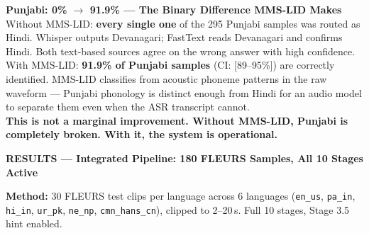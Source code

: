 \documentclass[11pt,a4paper]{article}
\begin{document}
\begin{tcolorbox}[enhanced,colback=LOrange,colframe=DOrange,arc=6pt,boxrule=2pt,
  left=9pt,right=9pt,top=7pt,bottom=7pt]
\textbf{\color{DOrange}\large Punjabi: 0\% $\to$ 91.9\% --- The Binary Difference MMS-LID Makes}\\[4pt]
Without MMS-LID: \textbf{every single one} of the 295 Punjabi samples was routed as Hindi. Whisper outputs Devanagari; FastText reads Devanagari and confirms Hindi. Both text-based sources agree on the wrong answer with high confidence.\\[4pt]
With MMS-LID: \textbf{91.9\% of Punjabi samples} (CI: [89--95\%]) are correctly identified. MMS-LID classifies from acoustic phoneme patterns in the raw waveform --- Punjabi phonology is distinct enough from Hindi for an audio model to separate them even when the ASR transcript cannot.\\[4pt]
\textbf{This is not a marginal improvement. Without MMS-LID, Punjabi is completely broken. With it, the system is operational.}
\end{tcolorbox}

\newpage

\begin{tcolorbox}[enhanced,colback=DOrange,colframe=DOrange,arc=5pt,boxrule=0pt,
  left=10pt,right=10pt,top=5pt,bottom=5pt]
{\large\bfseries\color{white}RESULTS --- Integrated Pipeline: 180 FLEURS Samples, All 10 Stages Active}
\end{tcolorbox}

\vspace{5pt}

\begin{tcolorbox}[enhanced,colback=LGray,colframe=MGray!50,arc=4pt,boxrule=0.7pt,
  left=7pt,right=7pt,top=4pt,bottom=4pt]
\small\textbf{Method:} 30 FLEURS test clips per language across 6 languages (\texttt{en\_us}, \texttt{pa\_in}, \texttt{hi\_in}, \texttt{ur\_pk}, \texttt{ne\_np}, \texttt{cmn\_hans\_cn}), clipped to 2--20\,s. Full 10 stages, Stage 3.5 hint enabled.
\end{tcolorbox}

\vspace{5pt}
\end{document}
